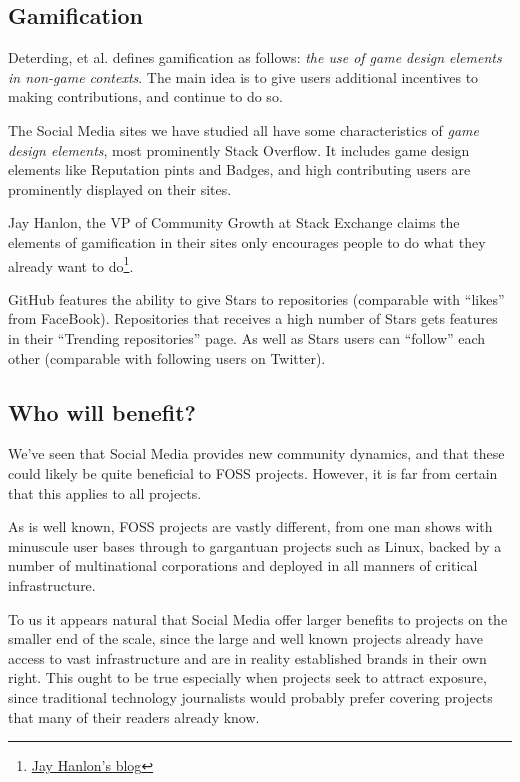 \documentclass[a4paper,11pt]{article} %
\begin{document}
\subsection{Gamification}

Deterding, et al.\cite{deterding2011game} defines gamification as follows:
\textit{the use of game design elements in non-game contexts}. The main idea
is to give users additional incentives to making contributions, and continue
to do so.

The Social Media sites we have studied all have some characteristics of
\textit{game design elements}, most prominently Stack Overflow. It includes
game design elements like Reputation pints and Badges, and high contributing
users are prominently displayed on their sites.

Jay Hanlon, the VP of Community Growth at Stack Exchange claims the elements
of gamification in their sites only encourages people to do what they
already want to
do\footnote{{\href{http://blog.stackoverflow.com/2013/09/five-years-ago-stack-overflow-launched-then-a-miracle-occurred/}{Jay
      Hanlon's blog}}}.

GitHub features the ability to give Stars to repositories (comparable with
``likes'' from FaceBook). Repositories that receives a high number of Stars
gets features in their ``Trending repositories'' page. As well as Stars
users can ``follow'' each other (comparable with following users on
Twitter).

\subsection{Who will benefit?}

We've seen that Social Media provides new community dynamics, and that
these could likely be quite beneficial to FOSS projects. However, it
is far from certain that this applies to all projects.

As is well known, FOSS projects are vastly different, from one man
shows with minuscule user bases through to gargantuan projects such as
Linux, backed by a number of multinational corporations and deployed
in all manners of critical infrastructure.

To us it appears natural that Social Media offer larger benefits to
projects on the smaller end of the scale, since the large and well
known projects already have access to vast infrastructure and are in
reality established brands in their own right. This ought to be true
especially when projects seek to attract exposure, since traditional
technology journalists would probably prefer covering projects that
many of their readers already know.
\end{document}
